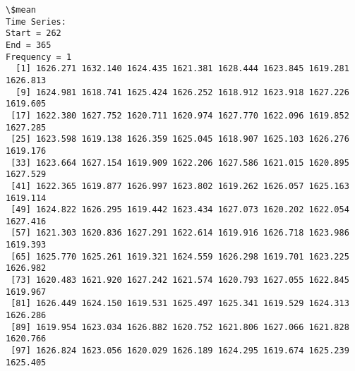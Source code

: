 \documentclass[11pt]{article}
\begin{document}
    \begin{Verbatim}[commandchars=\\\{\}]
\$mean
Time Series:
Start = 262 
End = 365 
Frequency = 1 
  [1] 1626.271 1632.140 1624.435 1621.381 1628.444 1623.845 1619.281 1626.813
  [9] 1624.981 1618.741 1625.424 1626.252 1618.912 1623.918 1627.226 1619.605
 [17] 1622.380 1627.752 1620.711 1620.974 1627.770 1622.096 1619.852 1627.285
 [25] 1623.598 1619.138 1626.359 1625.045 1618.907 1625.103 1626.276 1619.176
 [33] 1623.664 1627.154 1619.909 1622.206 1627.586 1621.015 1620.895 1627.529
 [41] 1622.365 1619.877 1626.997 1623.802 1619.262 1626.057 1625.163 1619.114
 [49] 1624.822 1626.295 1619.442 1623.434 1627.073 1620.202 1622.054 1627.416
 [57] 1621.303 1620.836 1627.291 1622.614 1619.916 1626.718 1623.986 1619.393
 [65] 1625.770 1625.261 1619.321 1624.559 1626.298 1619.701 1623.225 1626.982
 [73] 1620.483 1621.920 1627.242 1621.574 1620.793 1627.055 1622.845 1619.967
 [81] 1626.449 1624.150 1619.531 1625.497 1625.341 1619.529 1624.313 1626.286
 [89] 1619.954 1623.034 1626.882 1620.752 1621.806 1627.066 1621.828 1620.766
 [97] 1626.824 1623.056 1620.029 1626.189 1624.295 1619.674 1625.239 1625.405


\end{Verbatim}
\end{document}
